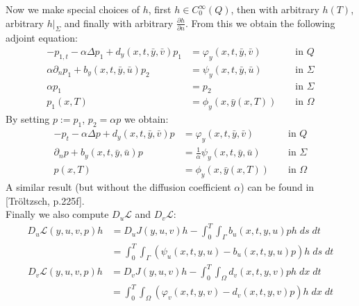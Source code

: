 \documentclass[
12pt, %
a4paper, %
onecolumn, %
portrait %
]{article}
\begin{document}
Now we make special choices of $h$, first $h \in C_0^\infty(Q)$, then with arbitrary $h(T)$, arbitrary $h|_\Sigma$  and finally with arbitrary $\frac{\partial h}{\partial n}$. From this we obtain the following adjoint equation:
\begin{equation}
\begin{alignedat}{2}
-p_{1,t} - \alpha \Delta p_1 + d_y(x,t,\bar{y}, \bar{v}) p_1 &= \varphi_y(x,t,\bar{y}, \bar{v}) &&\text{ in } Q \\
\alpha \partial_n p_1 + b_y(x,t,\bar{y}, \bar{u}) p_2 &= \psi_y(x,t,\bar{y}, \bar{u}) &&\text{ in } \Sigma \\
\alpha p_1 &= p_2 &&\text{ in } \Sigma \\
p_1(x,T) &= \phi_y(x, \bar{y}(x,T)) &&\text{ in } \Omega
\label{eq:adjoint-pde-preliminary}
\end{alignedat}
\end{equation}
By setting $p := p_1$, $p_2 = \alpha p$ we obtain:
\begin{equation}
\begin{alignedat}{2}
-p_t - \alpha \Delta p + d_y(x,t,\bar{y}, \bar{v}) p &= \varphi_y(x,t,\bar{y}, \bar{v}) &&\text{ in } Q \\
\partial_n p + b_y(x,t,\bar{y}, \bar{u}) p &= \frac{1}{\alpha}\psi_y(x,t,\bar{y}, \bar{u}) &&\text{ in } \Sigma \\
p(x,T) &= \phi_y(x, \bar{y}(x,T)) &&\text{ in } \Omega
\label{eq:adjoint-pde}
\end{alignedat}
\end{equation}
A similar result (but without the diffusion coefficient $\alpha$) can be found in [Tr\"oltzsch, p.225f].\\
Finally we also compute $D_u \mathcal{L}$ and $D_v \mathcal{L}$:
\begin{align*}
D_u \mathcal{L}(y,u,v, p) h & = D_u J(y,u,v) h - \int_{0}^{T} \int_{\Gamma} b_u(x,t,y,u) p h \; ds \; dt \\
& = \int_{0}^{T} \int_{\Gamma}  (\psi_u(x,t,y,u) -  b_u(x,t,y,u) p)  h \; ds \; dt
\end{align*}
\begin{align*}
D_v \mathcal{L}(y,u,v, p) h & = D_v J(y,u,v) h - \int_{0}^{T} \int_{\Omega} d_v(x,t,y,v) p h \; dx \; dt \\
& = \int_{0}^{T} \int_{\Omega}  (\varphi_v(x,t,y,v) -  d_v(x,t,y,v) p)  h \; dx \; dt
\end{align*}
\end{document}
